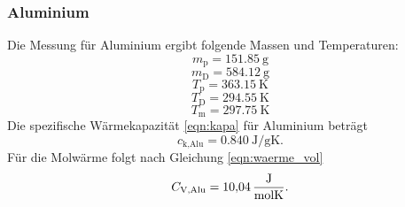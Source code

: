 \subsubsection{Aluminium}
Die Messung für Aluminium ergibt folgende Massen und Temperaturen:
\begin{equation*}
    m_\text{p} = \SI{151.85}{\gram}
\end{equation*}
\begin{equation*}
    m_\text{D} = \SI{584.12}{\gram}
\end{equation*}
\begin{equation*}
    T_\text{p} = \SI{363.15}{\kelvin}
\end{equation*}
\begin{equation*}
    T_\text{D} = \SI{294.55}{\kelvin}
\end{equation*}
\begin{equation*}
    T_\text{m} = \SI{297.75}{\kelvin}
\end{equation*}
Die spezifische Wärmekapazität \eqref{eqn:kapa} für Aluminium beträgt
\begin{equation}
    c_\text{k,Alu} = \SI{0.840}{\joule/\gram\kelvin} .
\end{equation}
Für die Molwärme folgt nach Gleichung \eqref{eqn:waerme_vol}
\begin{equation}
    C_\text{V,Alu} = \SI{10.04}{\frac{\joule}{\mol\kelvin}} .
\end{equation}